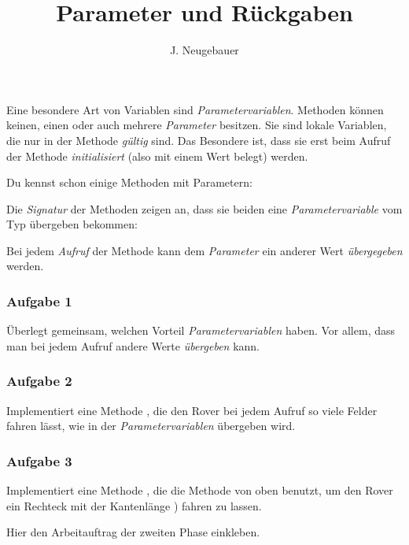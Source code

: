 \documentclass[10pt, a4paper]{scrartcl}
\author{J. Neugebauer}
\title{Parameter und Rückgaben}
\date{\Heute}
\begin{document}
\ReiheTitel[Parameter]

Eine besondere Art von Variablen sind \emph{Parametervariablen}. Methoden können keinen, einen oder auch mehrere \emph{Parameter} besitzen. Sie sind lokale Variablen, die nur in der Methode \emph{gültig} sind. Das Besondere ist, dass sie erst beim Aufruf der Methode \emph{initialisiert} (also mit einem Wert belegt) werden.

Du kennst schon einige Methoden mit Parametern:
\begin{smallitemize}
	\item {}
	\item {}
\end{smallitemize}

Die \emph{Signatur} der Methoden zeigen an, dass sie beiden eine \emph{Parametervariable} vom Typ  übergeben bekommen: 

Bei jedem \emph{Aufruf} der Methode kann dem \emph{Parameter} ein anderer Wert \emph{übergegeben} werden.

\subsubsection*{Aufgabe 1}
Überlegt gemeinsam, welchen Vorteil \emph{Parametervariablen} haben. Vor allem, dass man bei jedem Aufruf andere Werte \emph{übergeben} kann.

\subsubsection*{Aufgabe 2}
Implementiert eine Methode , die den Rover bei jedem Aufruf so viele Felder fahren lässt, wie in der \emph{Parametervariablen}  übergeben wird.

\subsubsection*{Aufgabe 3}
Implementiert eine Methode , die die Methode  von oben benutzt, um den Rover ein Rechteck mit der Kantenlänge ) fahren zu lassen.

\vspace{2cm}
\begin{tcolorbox}[colframe=black!60,colback=black!10,width=\textwidth,height=5cm,center,boxrule=1pt]
\begin{center}
Hier den Arbeitauftrag der zweiten Phase einkleben.
\end{center}
\end{tcolorbox}
\end{document}
